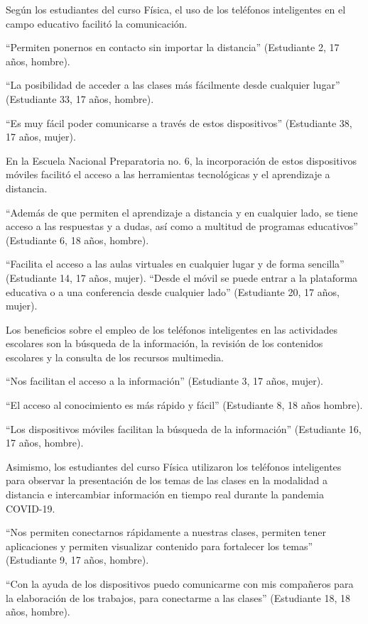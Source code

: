 \documentclass[spanish]{textolivre}
\begin{document}
Según los estudiantes del curso Física, el uso de los teléfonos inteligentes en el campo educativo facilitó la comunicación.

“Permiten ponernos en contacto sin importar la distancia” (Estudiante 2, 17 años, hombre).

“La posibilidad de acceder a las clases más fácilmente desde cualquier lugar” (Estudiante 33, 17 años, hombre).

“Es muy fácil poder comunicarse a través de estos dispositivos” (Estudiante 38, 17 años, mujer).

En la Escuela Nacional Preparatoria no. 6, la incorporación de estos dispositivos móviles facilitó el acceso a las herramientas tecnológicas y el aprendizaje a distancia.

“Además de que permiten el aprendizaje a distancia y en cualquier lado, se tiene acceso a las respuestas y a dudas, así como a multitud de programas educativos” (Estudiante 6, 18 años, hombre).

“Facilita el acceso a las aulas virtuales en cualquier lugar y de forma sencilla” (Estudiante 14, 17 años, mujer).
 “Desde el móvil se puede entrar a la plataforma educativa o a una conferencia desde cualquier lado” (Estudiante 20, 17 años, mujer).
 
Los beneficios sobre el empleo de los teléfonos inteligentes en las actividades escolares son la búsqueda de la información, la revisión de los contenidos escolares y la consulta de los recursos multimedia.

“Nos facilitan el acceso a la información” (Estudiante 3, 17 años, mujer).

“El acceso al conocimiento es más rápido y fácil” (Estudiante 8, 18 años hombre).

“Los dispositivos móviles facilitan la búsqueda de la información” (Estudiante 16, 17 años, hombre).

Asimismo, los estudiantes del curso Física utilizaron los teléfonos inteligentes para observar la presentación de los temas de las clases en la modalidad a distancia e intercambiar información en tiempo real durante la pandemia COVID-19.

“Nos permiten conectarnos rápidamente a nuestras clases, permiten tener aplicaciones y permiten visualizar contenido para fortalecer los temas” (Estudiante 9, 17 años, hombre).

 “Con la ayuda de los dispositivos puedo comunicarme con mis compañeros para la elaboración de los trabajos, para conectarme a las clases” (Estudiante 18, 18 años, hombre).
 
\end{document}
